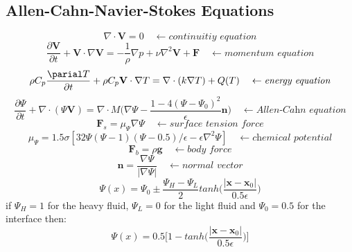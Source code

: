 \documentclass[12pt]{extarticle}
\begin{document}
\subsection*{Allen-Cahn-Navier-Stokes Equations}
\begin{equation}
\nabla \cdot  \textbf{V} = 0   \quad \leftarrow \textit{continuitiy equation}
\end{equation}
\begin{equation}
\frac{\partial \textbf{V}}{\partial t} + \textbf{V} \cdot \nabla \textbf{V} = - \frac{1}{\rho} \nabla p + \nu \nabla^{2} \textbf{V} + \textbf{F} \quad \leftarrow \textit{momentum equation}
\end{equation}
\begin{equation}
\rho C_{p} \frac{\parial T}{\partial t} + \rho C_{p} \textbf{V} \cdot \nabla T = \nabla \cdot (k \nabla T) + Q(T) \quad \leftarrow \textit{energy equation}
\end{equation}
\begin{equation}
\frac{\partial \Psi}{\partial t} + \nabla \cdot \left(\Psi \textbf{V} \right) = \nabla \cdot M \Bigg( \nabla \Psi - \frac{1-4(\Psi - \Psi_{0})^{2}}{\epsilon} \textbf{n} \Bigg) \quad \leftarrow \textit{Allen-Cahn equation}
\end{equation} 
\begin{equation}
\textbf{F}_{s} = \mu_{\Psi} \nabla \Psi \quad \leftarrow \textit{surface tension force}
\end{equation}
\begin{equation}
\mu_{\Psi} = 1.5 \sigma [32 \Psi(\Psi-1)(\Psi-0.5)/ \epsilon - \epsilon \nabla^{2} \Psi] \quad \leftarrow \textit{chemical potential}
\end{equation}
\begin{equation}
\textbf{F}_{b} = \rho \textbf{g} \quad \leftarrow \textit{body force}
\end{equation}
\begin{equation}
\textbf{n} = \frac{\nabla \Psi}{| \nabla \Psi |} \quad \leftarrow \textit{normal vector}
\end{equation}
\begin{equation}
\Psi(x) = \Psi_{0} \pm \frac{\Psi_{H}-\Psi_{L}}{2} tanh\Big(\frac{| \textbf{x} - \textbf{x}_0|}{0.5\epsilon}  \Big)
\end{equation}
if $\Psi_{H} = 1$ for the heavy fluid, $\Psi_{L} = 0$ for the light fluid and $\Psi_{0} = 0.5$ for the interface then:
\begin{equation}
\Psi(x) = 0.5 \Big[ 1 - tanh \Big( \frac{| \textbf{x} - \textbf{x}_0|}{0.5\epsilon} \Big) \Big]
\end{equation}
\end{document}

